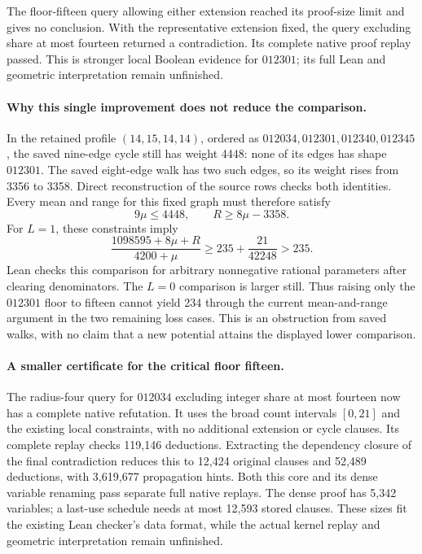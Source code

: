 \documentclass[11pt,a4paper]{article}
\theoremstyle{definition}
\theoremstyle{remark}
\begin{document}
The floor-fifteen query allowing either extension reached its proof-size
limit and gives no conclusion. With the representative extension fixed,
the query excluding share at most fourteen returned a contradiction.
Its complete native proof replay passed. This is stronger local Boolean
evidence for $012301$; its full Lean and geometric interpretation remain
unfinished.

\paragraph{Why this single improvement does not reduce the comparison.}
In the retained profile $(14,15,14,14)$, ordered as
$012034,012301,012340,012345$, the saved nine-edge cycle still has weight
4448: none of its edges has shape $012301$. The saved eight-edge walk
has two such edges, so its weight rises from 3356 to 3358. Direct
reconstruction of the source rows checks both identities. Every mean
and range for this fixed graph must therefore satisfy
\[
9\mu\le4448,\qquad R\ge8\mu-3358.
\]
For $L=1$, these constraints imply
\[
\frac{1098595+8\mu+R}{4200+\mu}
\ge235+\frac{21}{42248}>235.
\]
Lean checks this comparison for arbitrary nonnegative rational parameters
after clearing denominators. The $L=0$ comparison is larger still.
Thus raising only the $012301$ floor to fifteen cannot yield 234 through
the current mean-and-range argument in the two remaining loss cases.
This is an obstruction from saved walks, with no claim that a new
potential attains the displayed lower comparison.

\paragraph{A smaller certificate for the critical floor fifteen.}
The radius-four query for $012034$ excluding integer share at most fourteen
now has a complete native refutation. It uses the broad count intervals
$[0,21]$ and the existing local constraints, with no additional extension
or cycle clauses. Its complete replay checks 119,146 deductions.
Extracting the dependency closure of the final contradiction reduces this
to 12,424 original clauses and 52,489 deductions, with 3,619,677 propagation
hints. Both this core and its dense variable renaming pass separate full
native replays. The dense proof has 5,342 variables; a last-use schedule
needs at most 12,593 stored clauses. These sizes fit the existing Lean
checker's data format, while the actual kernel replay and geometric
interpretation remain unfinished.
\end{document}
